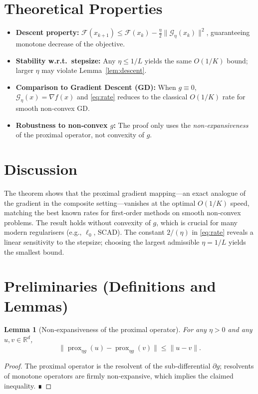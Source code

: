 \documentclass{article}
\newtheorem{lemma}{Lemma}
\newcommand{\prox}{\operatorname{prox}}
\newcommand{\grad}{\nabla}
\newcommand{\R}{\mathbb{R}}
\newcommand{\G}{\mathcal{G}}
\newcommand{\F}{\mathcal{F}}
\begin{document}
\section*{Theoretical Properties}
\begin{itemize}
  \item \textbf{Descent property:} $\F(x_{k+1})\le \F(x_{k})-\frac{\eta}{2}\|\G_{\eta}(x_{k})\|^{2}$, guaranteeing monotone decrease of the objective.
  \item \textbf{Stability w.r.t.\ stepsize:} Any $\eta\le1/L$ yields the same $O(1/K)$ bound; larger $\eta$ may violate Lemma~\ref{lem:descent}.
  \item \textbf{Comparison to Gradient Descent (GD):} When $g\equiv0$, $\G_{\eta}(x)=\grad f(x)$ and \eqref{eq:rate} reduces to the classical $O(1/K)$ rate for smooth non‑convex GD.
  \item \textbf{Robustness to non‑convex $g$:} The proof only uses the \emph{non‑expansiveness} of the proximal operator, not convexity of $g$.
\end{itemize}

\section*{Discussion}
The theorem shows that the proximal gradient mapping—an exact analogue of the gradient in the composite setting—vanishes at the optimal $O(1/K)$ speed, matching the best known rates for first‑order methods on smooth non‑convex problems. The result holds without convexity of $g$, which is crucial for many modern regularisers (e.g., $\ell_{0}$, SCAD). The constant $2/(\eta)$ in \eqref{eq:rate} reveals a linear sensitivity to the stepsize; choosing the largest admissible $\eta=1/L$ yields the smallest bound.

\newpage
\section*{Preliminaries (Definitions and Lemmas)}
\begin{lemma}[Non‑expansiveness of the proximal operator]\label{lem:nonexp}
For any $\eta>0$ and any $u,v\in\R^{d}$,
\[
\bigl\|\prox_{\eta g}(u)-\prox_{\eta g}(v)\bigr\|\le\|u-v\|.
\]
\end{lemma}
\begin{proof}
The proximal operator is the resolvent of the sub‑differential $\partial g$; resolvents of monotone operators are firmly non‑expansive, which implies the claimed inequality. ∎
\end{proof}
\end{document}
